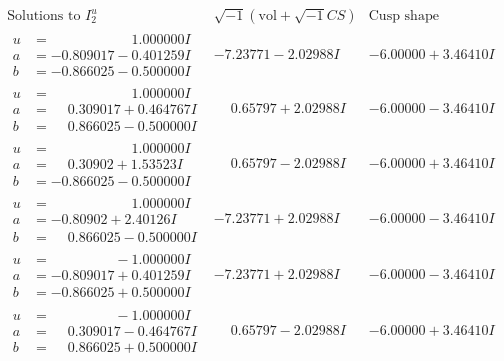\documentclass[1p]{elsarticle_modified}
\theoremstyle{definition}
\newcommand{\I}{\sqrt{-1}}
\begin{document}
$$\begin{array}{c|c|c}  
\text{Solutions to }I^u_{2}& \I (\text{vol} + \sqrt{-1}CS) & \text{Cusp shape}\\
 \hline 
\begin{aligned}
u &= \phantom{-0.000000 -}1.000000 I \\
a &= -0.809017 - 0.401259 I \\
b &= -0.866025 - 0.500000 I\end{aligned}
 & -7.23771 - 2.02988 I & -6.00000 + 3.46410 I \\ \hline\begin{aligned}
u &= \phantom{-0.000000 -}1.000000 I \\
a &= \phantom{-}0.309017 + 0.464767 I \\
b &= \phantom{-}0.866025 - 0.500000 I\end{aligned}
 & \phantom{-}0.65797 + 2.02988 I & -6.00000 - 3.46410 I \\ \hline\begin{aligned}
u &= \phantom{-0.000000 -}1.000000 I \\
a &= \phantom{-}0.30902 + 1.53523 I \\
b &= -0.866025 - 0.500000 I\end{aligned}
 & \phantom{-}0.65797 - 2.02988 I & -6.00000 + 3.46410 I \\ \hline\begin{aligned}
u &= \phantom{-0.000000 -}1.000000 I \\
a &= -0.80902 + 2.40126 I \\
b &= \phantom{-}0.866025 - 0.500000 I\end{aligned}
 & -7.23771 + 2.02988 I & -6.00000 - 3.46410 I \\ \hline\begin{aligned}
u &= \phantom{-0.000000 } -1.000000 I \\
a &= -0.809017 + 0.401259 I \\
b &= -0.866025 + 0.500000 I\end{aligned}
 & -7.23771 + 2.02988 I & -6.00000 - 3.46410 I \\ \hline\begin{aligned}
u &= \phantom{-0.000000 } -1.000000 I \\
a &= \phantom{-}0.309017 - 0.464767 I \\
b &= \phantom{-}0.866025 + 0.500000 I\end{aligned}
 & \phantom{-}0.65797 - 2.02988 I & -6.00000 + 3.46410 I \\ \hline\begin{aligned}

\end{aligned}
\end{array}$$
\end{document}
